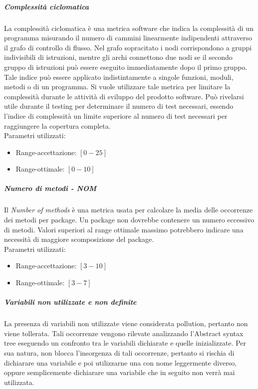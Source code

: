 \subparagraph{Complessità ciclomatica}
La complessità ciclomatica è una metrica software che indica la complessità di un programma
misurando il numero di cammini linearmente indipendenti attraverso il grafo di controllo di flusso.
Nel grafo sopracitato i nodi corrispondono a gruppi indivisibili di istruzioni, mentre gli archi
connettono due nodi se il secondo gruppo di istruzioni può essere eseguito immediatamente dopo
il primo gruppo. Tale indice può essere applicato indistintamente a singole funzioni, moduli,
metodi o  di un programma. Si vuole utilizzare tale metrica per limitare la complessità
durante le attività di sviluppo del prodotto software. Può rivelarsi utile durante il testing per
determinare il numero  di test necessari, essendo l’indice di complessità un limite superiore
al numero di test necessari per raggiungere la copertura completa. \\

Parametri utilizzati:
\begin{itemize}
\item Range-accettazione: $[0 - 25]$
\item Range-ottimale: $[0 - 10]$
\end{itemize}

\subparagraph{Numero di metodi - NOM}
Il \emph{Number of methods} è una metrica usata per calcolare la media delle occorrenze dei metodi per package. Un package non dovrebbe contenere un numero eccessivo di metodi. Valori superiori al range ottimale massimo potrebbero indicare una necessità di maggiore scomposizione del package. \\

Parametri utilizzati: 
\begin{itemize}
\item Range-accettazione: $[3 - 10]$
\item Range-ottimale: $[3 - 7]$
\end{itemize}

\subparagraph{Variabili non utilizzate e non definite}
La presenza di variabili non utilizzate viene considerata pollution, pertanto non viene tollerata.
Tali occorrenze vengono rilevate analizzando l’Abstract syntax tree
eseguendo un confronto tra le variabili  dichiarate e quelle
inizializzate. Per sua natura,  non blocca
l’insorgenza di tali occorrenze, pertanto si rischia di dichiarare una
variabile  e poi utilizzarne una
con nome leggermente diverso, oppure semplicemente dichiarare una variabile che in seguito non
verrà mai utilizzata.\\

